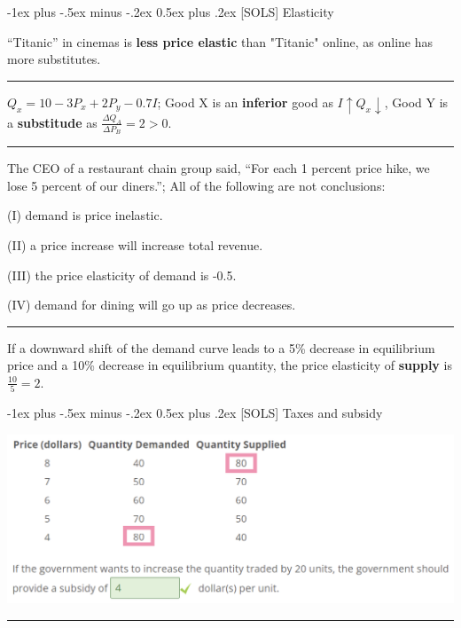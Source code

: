 \documentclass[a4paper]{article}
\makeatletter
\renewcommand{\section}{\@startsection{section}{1}{0mm}%
                                {-1ex plus -.5ex minus -.2ex}%
                                {0.5ex plus .2ex}%
                                {\normalfont\large\bfseries}}
\makeatother
\begin{document}
\begin{multicols*}{3}
        \section{[SOLS] Elasticity}

        “Titanic” in cinemas is \textbf{less price elastic} than "Titanic" online, as online has more substitutes.

        \rule{1\linewidth}{0.4pt}

    $Q_x=10-3P_x+2P_y-0.7I$; Good X is an \textbf{inferior} good as $I\uparrow Q_x\downarrow$, Good Y is a \textbf{substitude} as $\frac{\Delta Q_A}{\Delta P_B} = 2 > 0$.

        \rule{1\linewidth}{0.4pt}

        The CEO of a restaurant chain group said, “For each 1 percent price hike, we lose 5 percent of our diners.”; All of the following are not conclusions:

        (I) demand is price inelastic.

        (II) a price increase will increase total revenue.

        (III) the price elasticity of demand is -0.5.

        (IV) demand for dining will go up as price decreases.

        \rule{1\linewidth}{0.4pt}

        If a downward shift of the demand curve leads to a 5\% decrease in equilibrium price and a 10\% decrease in equilibrium quantity, the price elasticity of \textbf{supply} is $\frac{10}{5} = 2$.

        \section{[SOLS] Taxes and subsidy}

        \includegraphics[width=\linewidth]{./tax3.png}

        \rule{1\linewidth}{0.4pt}


\end{multicols*}
\end{document}
